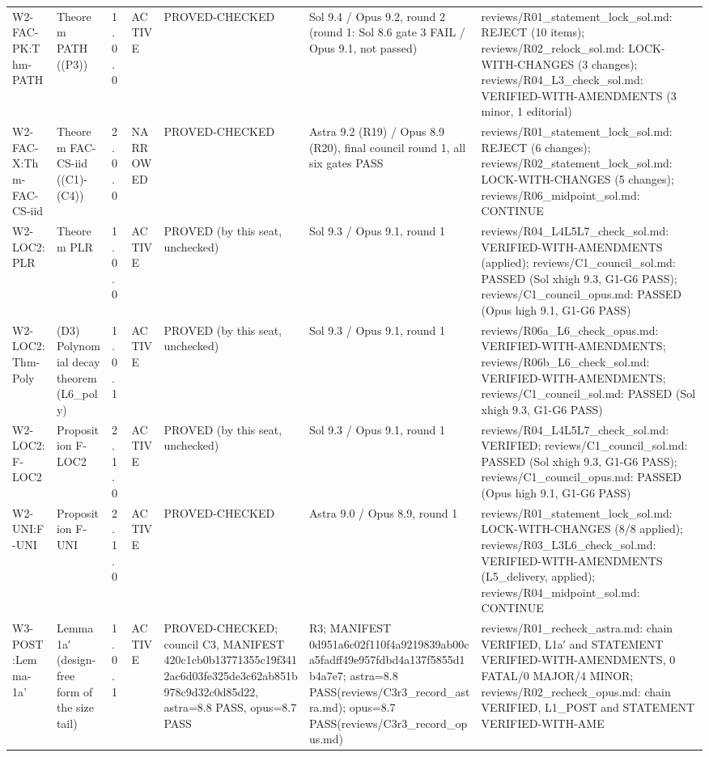 \begin{longtable}{p{2.2cm}p{2.2cm}p{0.7cm}p{1.2cm}p{3.2cm}p{1.8cm}p{3cm}}
W2-FAC-PK:Thm-PATH & Theorem PATH ((P3)) & 1.0.0 & ACTIVE & PROVED-CHECKED & Sol 9.4 / Opus 9.2, round 2 (round 1: Sol 8.6 gate 3 FAIL / Opus 9.1, not passed) & reviews/R01\_statement\_lock\_sol.md: REJECT (10 items); reviews/R02\_relock\_sol.md: LOCK-WITH-CHANGES (3 changes); reviews/R04\_L3\_check\_sol.md: VERIFIED-WITH-AMENDMENTS (3 minor, 1 editorial) \\
W2-FAC-X:Thm-FAC-CS-iid & Theorem FAC-CS-iid ((C1)-(C4)) & 2.0.0 & NARROWED & PROVED-CHECKED & Astra 9.2 (R19) / Opus 8.9 (R20), final council round 1, all six gates PASS & reviews/R01\_statement\_lock\_sol.md: REJECT (6 changes); reviews/R02\_statement\_lock\_sol.md: LOCK-WITH-CHANGES (5 changes); reviews/R06\_midpoint\_sol.md: CONTINUE \\
W2-LOC2:PLR & Theorem PLR & 1.0.0 & ACTIVE & PROVED (by this seat, unchecked) & Sol 9.3 / Opus 9.1, round 1 & reviews/R04\_L4L5L7\_check\_sol.md: VERIFIED-WITH-AMENDMENTS (applied); reviews/C1\_council\_sol.md: PASSED (Sol xhigh 9.3, G1-G6 PASS); reviews/C1\_council\_opus.md: PASSED (Opus high 9.1, G1-G6 PASS) \\
W2-LOC2:Thm-Poly & (D3) Polynomial decay theorem (L6\_poly) & 1.0.1 & ACTIVE & PROVED (by this seat, unchecked) & Sol 9.3 / Opus 9.1, round 1 & reviews/R06a\_L6\_check\_opus.md: VERIFIED-WITH-AMENDMENTS; reviews/R06b\_L6\_check\_sol.md: VERIFIED-WITH-AMENDMENTS; reviews/C1\_council\_sol.md: PASSED (Sol xhigh 9.3, G1-G6 PASS) \\
W2-LOC2:F-LOC2 & Proposition F-LOC2 & 2.1.0 & ACTIVE & PROVED (by this seat, unchecked) & Sol 9.3 / Opus 9.1, round 1 & reviews/R04\_L4L5L7\_check\_sol.md: VERIFIED; reviews/C1\_council\_sol.md: PASSED (Sol xhigh 9.3, G1-G6 PASS); reviews/C1\_council\_opus.md: PASSED (Opus high 9.1, G1-G6 PASS) \\
W2-UNI:F-UNI & Proposition F-UNI & 2.1.0 & ACTIVE & PROVED-CHECKED & Astra 9.0 / Opus 8.9, round 1 & reviews/R01\_statement\_lock\_sol.md: LOCK-WITH-CHANGES (8/8 applied); reviews/R03\_L3L6\_check\_sol.md: VERIFIED-WITH-AMENDMENTS (L5\_delivery, applied); reviews/R04\_midpoint\_sol.md: CONTINUE \\
W3-POST:Lemma-1a' & Lemma 1a′ (design-free form of the size tail) & 1.0.1 & ACTIVE & PROVED-CHECKED; council C3, MANIFEST 420c1cb0b13771355c19f3412ac6d03fe325de3c62ab851b978c9d32c0d85d22, astra=8.8 PASS, opus=8.7 PASS & R3; MANIFEST 0d951a6c02f110f4a9219839ab00ca5fadff49e957fdbd4a137f5855d1b4a7e7; astra=8.8 PASS(reviews/C3r3\_record\_astra.md); opus=8.7 PASS(reviews/C3r3\_record\_opus.md) & reviews/R01\_recheck\_astra.md: chain VERIFIED, L1a′ and STATEMENT VERIFIED-WITH-AMENDMENTS, 0 FATAL/0 MAJOR/4 MINOR; reviews/R02\_recheck\_opus.md: chain VERIFIED, L1\_POST and STATEMENT VERIFIED-WITH-AME \\

\end{longtable}
